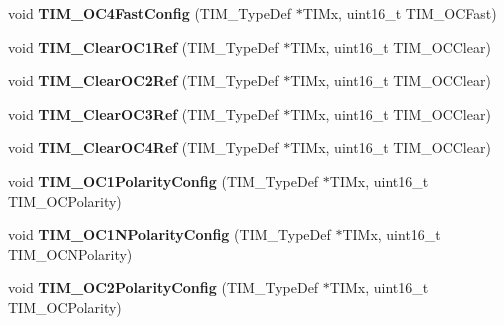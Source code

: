 \begin{DoxyCompactItemize}
\item 
\hypertarget{group__TIM__Exported__Functions_ga58279a04e8ea5333f1079d3cce8dde12}{
void {\bfseries TIM\_\-OC4FastConfig} (TIM\_\-TypeDef $\ast$TIMx, uint16\_\-t TIM\_\-OCFast)}
\label{group__TIM__Exported__Functions_ga58279a04e8ea5333f1079d3cce8dde12}

\item 
\hypertarget{group__TIM__Exported__Functions_ga34e926cd8a99cfcc7480b2d6de5118b6}{
void {\bfseries TIM\_\-ClearOC1Ref} (TIM\_\-TypeDef $\ast$TIMx, uint16\_\-t TIM\_\-OCClear)}
\label{group__TIM__Exported__Functions_ga34e926cd8a99cfcc7480b2d6de5118b6}

\item 
\hypertarget{group__TIM__Exported__Functions_gac474ebc815d24c8a589969e0c68b27b0}{
void {\bfseries TIM\_\-ClearOC2Ref} (TIM\_\-TypeDef $\ast$TIMx, uint16\_\-t TIM\_\-OCClear)}
\label{group__TIM__Exported__Functions_gac474ebc815d24c8a589969e0c68b27b0}

\item 
\hypertarget{group__TIM__Exported__Functions_ga0bd9476a14bd346c319945ec4fa2bc67}{
void {\bfseries TIM\_\-ClearOC3Ref} (TIM\_\-TypeDef $\ast$TIMx, uint16\_\-t TIM\_\-OCClear)}
\label{group__TIM__Exported__Functions_ga0bd9476a14bd346c319945ec4fa2bc67}

\item 
\hypertarget{group__TIM__Exported__Functions_gaeee5fa66b26e7c6f71850272dc3028f3}{
void {\bfseries TIM\_\-ClearOC4Ref} (TIM\_\-TypeDef $\ast$TIMx, uint16\_\-t TIM\_\-OCClear)}
\label{group__TIM__Exported__Functions_gaeee5fa66b26e7c6f71850272dc3028f3}

\item 
\hypertarget{group__TIM__Exported__Functions_ga03878f78163485c8a3508cff2111c297}{
void {\bfseries TIM\_\-OC1PolarityConfig} (TIM\_\-TypeDef $\ast$TIMx, uint16\_\-t TIM\_\-OCPolarity)}
\label{group__TIM__Exported__Functions_ga03878f78163485c8a3508cff2111c297}

\item 
\hypertarget{group__TIM__Exported__Functions_ga3cb91578e7dd34ea7d09862482960445}{
void {\bfseries TIM\_\-OC1NPolarityConfig} (TIM\_\-TypeDef $\ast$TIMx, uint16\_\-t TIM\_\-OCNPolarity)}
\label{group__TIM__Exported__Functions_ga3cb91578e7dd34ea7d09862482960445}

\item 
\hypertarget{group__TIM__Exported__Functions_ga6831cacaac1ef50291af94db94450797}{
void {\bfseries TIM\_\-OC2PolarityConfig} (TIM\_\-TypeDef $\ast$TIMx, uint16\_\-t TIM\_\-OCPolarity)}
\label{group__TIM__Exported__Functions_ga6831cacaac1ef50291af94db94450797}


\end{DoxyCompactItemize}
